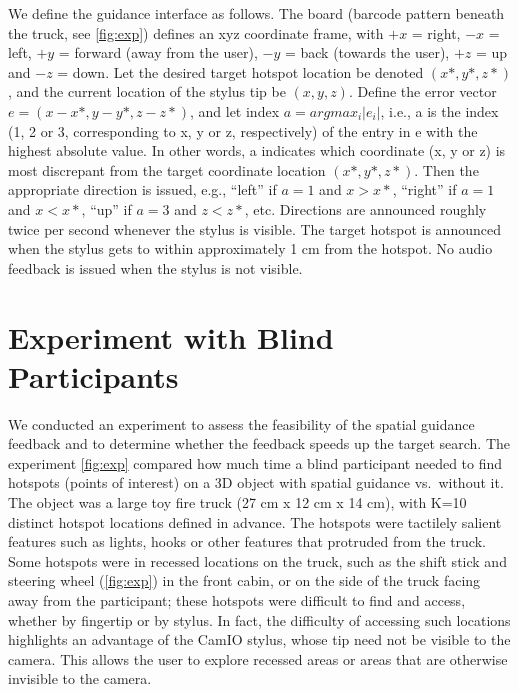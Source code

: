 \documentclass[runningheads]{res/templates/llncs}
\begin{document}
We define the guidance interface as follows. The board (barcode pattern
beneath the truck, see \ref{fig:exp}) defines an xyz coordinate frame,
with \(+x\) = right, \(-x\) = left, \(+y\) = forward (away from the
user), \(-y\) = back (towards the user), \(+z\) = up and \(-z\) = down.
Let the desired target hotspot location be denoted \((x*, y*, z*)\), and
the current location of the stylus tip be \((x,y,z)\). Define the error
vector \(e = (x-x*, y-y*, z-z*)\), and let index \(a = argmax_i |e_i|\),
i.e., a is the index (1, 2 or 3, corresponding to x, y or z,
respectively) of the entry in e with the highest absolute value. In
other words, a indicates which coordinate (x, y or z) is most discrepant
from the target coordinate location \((x*, y*, z*)\). Then the
appropriate direction is issued, e.g., ``left'' if \(a = 1\) and
\(x > x*\), ``right'' if \(a = 1\) and \(x < x*\), ``up'' if \(a = 3\)
and \(z < z*\), etc. Directions are announced roughly twice per second
whenever the stylus is visible. The target hotspot is announced when the
stylus gets to within approximately 1 cm from the hotspot. No audio
feedback is issued when the stylus is not visible.

\hypertarget{exp}{%
\section{Experiment with Blind Participants}\label{exp}}

We conducted an experiment to assess the feasibility of the spatial
guidance feedback and to determine whether the feedback speeds up the
target search. The experiment \ref{fig:exp} compared how much time a
blind participant needed to find hotspots (points of interest) on a 3D
object with spatial guidance vs.~without it. The object was a large toy
fire truck (27 cm x 12 cm x 14 cm), with K=10 distinct hotspot locations
defined in advance. The hotspots were tactilely salient features such as
lights, hooks or other features that protruded from the truck. Some
hotspots were in recessed locations on the truck, such as the shift
stick and steering wheel (\ref{fig:exp}) in the front cabin, or on the
side of the truck facing away from the participant; these hotspots were
difficult to find and access, whether by fingertip or by stylus. In
fact, the difficulty of accessing such locations highlights an advantage
of the CamIO stylus, whose tip need not be visible to the camera. This
allows the user to explore recessed areas or areas that are otherwise
invisible to the camera.
\end{document}
